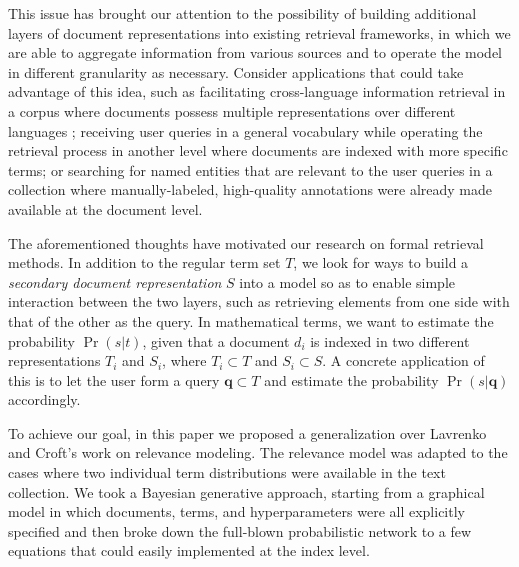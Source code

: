This issue has brought our attention to the possibility of building additional
layers of document representations into existing retrieval frameworks, in which
we are able to aggregate information from various sources and to operate the
model in different granularity as necessary.  Consider applications that could
take advantage of this idea, such as facilitating cross-language information
retrieval in a corpus where documents possess multiple representations over
different languages \cite{lavrenko2002cross-lingual}; receiving user queries in a general vocabulary while
operating the retrieval process in another level where documents are indexed
with more specific terms; or searching for named entities that are relevant to the
user queries in a collection where manually-labeled, high-quality annotations
were already made available at the document level.  

The aforementioned thoughts have motivated our research on formal retrieval
methods.  In addition to the regular term set $T$, we look {for} ways to build
a {\it secondary document representation} $S$ into a model so as to enable
simple interaction between the two layers, such as retrieving elements from one
side with that of the other as the query.  In mathematical terms, we want to
estimate the probability $\Pr(s|t)$, given that a document $d_i$ is indexed in
two different representations $T_i$ and $S_i$, where $T_i \subset T$ and $S_i
\subset S$.  A concrete application of this is to let the user form a query
$\mathbf{q} \subset T$ and estimate the probability $\Pr(s|\mathbf{q})$
accordingly.

To achieve our goal, in this paper we proposed a generalization over Lavrenko
and Croft's work \cite{lavrenko2001relevance} on relevance modeling.  The
relevance model was adapted to the cases where two individual term
distributions were available in the text collection.  We took a Bayesian
generative approach, starting from a graphical model in which documents, terms,
and hyperparameters were all explicitly specified and then broke down the
full-blown probabilistic network to a few equations that could easily
implemented at the index level.  

